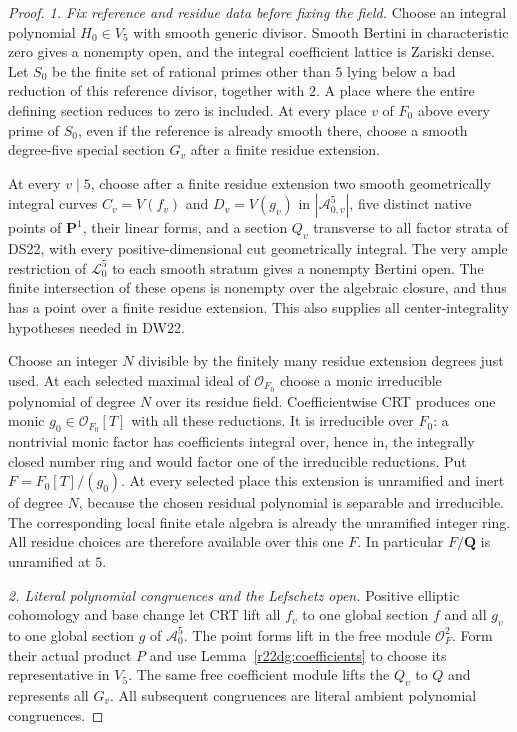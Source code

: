 \begin{proof}
\emph{1. Fix reference and residue data before fixing the field.}
Choose an integral polynomial $H_0\in V_5$ with smooth generic
divisor.  Smooth Bertini in characteristic zero gives a nonempty
open, and the integral coefficient lattice is Zariski dense.
Let $S_0$ be the finite set of rational primes other than $5$
lying below a bad reduction of this reference divisor, together
with $2$.  A place where the entire defining section reduces to
zero is included.  At every place $v$ of $F_0$ above every prime
of $S_0$, even if the reference is already smooth there, choose
a smooth degree-five special section $G_v$ after a finite residue
extension.

At every $v\mid5$, choose after a finite residue extension two
smooth geometrically integral curves
$C_v=V(f_v)$ and $D_v=V(g_v)$ in $|\mathcal A_{0,v}^5|$,
five distinct native points of $\mathbf P^1$, their linear forms,
and a section $Q_v$ transverse to all factor strata of DS22,
with every positive-dimensional cut geometrically integral.
The very ample restriction of $\mathcal L_0^5$ to each smooth
stratum gives a nonempty Bertini open.  The finite intersection
of these opens is nonempty over the algebraic closure, and thus
has a point over a finite residue extension.  This also supplies
all center-integrality hypotheses needed in DW22.

Choose an integer $N$ divisible by the finitely many residue
extension degrees just used.  At each selected maximal ideal of
$\mathcal O_{F_0}$ choose a monic irreducible polynomial of degree
$N$ over its residue field.  Coefficientwise CRT produces one
monic $g_0\in\mathcal O_{F_0}[T]$ with all these reductions.
It is irreducible over $F_0$: a nontrivial monic factor has
coefficients integral over, hence in, the integrally closed number
ring and would factor one of the irreducible reductions.
Put $F=F_0[T]/(g_0)$.  At every selected place this extension is
unramified and inert of degree $N$, because the chosen residual
polynomial is separable and irreducible.  The corresponding local
finite etale algebra is already the unramified integer ring.
All residue choices are therefore available over this one $F$.
In particular $F/\mathbf Q$ is unramified at $5$.

\emph{2. Literal polynomial congruences and the Lefschetz open.}
Positive elliptic cohomology and base change let CRT lift all
$f_v$ to one global section $f$ and all $g_v$ to one global
section $g$ of $\mathcal A_0^5$.  The point forms lift in the free
module $\mathcal O_F^2$.  Form their actual product $P$ and use
Lemma~\ref{r22dg:coefficients} to choose its representative in
$V_5$.  The same free coefficient module lifts the $Q_v$ to $Q$
and represents all $G_v$.  All subsequent congruences are literal
ambient polynomial congruences.


\end{proof}
